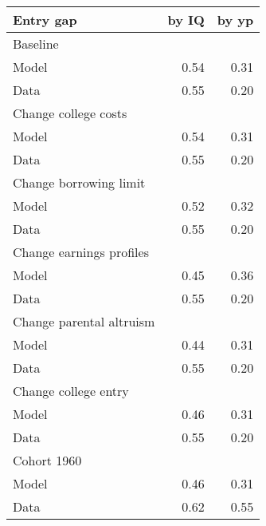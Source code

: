 \begin{tabular}{lrr}
\hline
Entry gap & by IQ  & by yp  \\ 
\hline
Baseline &   &   \\ 
Model & 0.54  & 0.31  \\ 
Data & 0.55  & 0.20  \\ 
Change college costs &   &   \\ 
Model & 0.54  & 0.31  \\ 
Data & 0.55  & 0.20  \\ 
Change borrowing limit &   &   \\ 
Model & 0.52  & 0.32  \\ 
Data & 0.55  & 0.20  \\ 
Change earnings profiles &   &   \\ 
Model & 0.45  & 0.36  \\ 
Data & 0.55  & 0.20  \\ 
Change parental altruism &   &   \\ 
Model & 0.44  & 0.31  \\ 
Data & 0.55  & 0.20  \\ 
Change college entry &   &   \\ 
Model & 0.46  & 0.31  \\ 
Data & 0.55  & 0.20  \\ 
Cohort 1960 &   &   \\ 
Model & 0.46  & 0.31  \\ 
Data & 0.62  & 0.55  \\ 
\hline
\end{tabular}%
